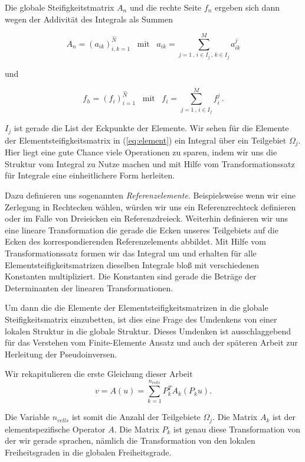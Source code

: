Die globale Steifigkeitstmatrix $A_n$ und die rechte Seite $f_n$ ergeben sich dann wegen der Addivität des Integrals als Summen

\begin{equation*}
A_n = (a_{ik})_{i,k=1}^{\hat{N}} \, \, \, \text{ mit } \, \, \, a_{ik} = \sum_{j=1 \, , \, i \in I_j \, , \, k \in I_j }^M a_{ik}^j  
\end{equation*}

und

\begin{equation*}
f_h = (f_i)_{i=1}^{\hat{N}} \, \, \, \text{ mit } \, \, \, f_i = \sum_{j=1 \, , \, i \in I_j}^M f_i^j \, .
\end{equation*}

$I_j$ ist gerade die List der Eckpunkte der Elemente.
Wir sehen für die Elemente der Elementsteifigkeitsmatrix in (\ref{eq:element}) ein Integral über ein Teilgebiet $\Omega_j$. Hier liegt eine gute Chance viele Operationen zu sparen, indem wir uns die Struktur vom Integral zu Nutze machen und mit Hilfe vom Transformationssatz für Integrale eine einheitlichere Form herleiten.

Dazu definieren uns sogenannten \textit{Referenzelemente}. Beispielsweise wenn wir eine Zerlegung in Rechtecken wählen, würden wir uns ein Referenzrechteck definieren oder im Falle von Dreieicken ein Referenzdreieck. Weiterhin definieren wir uns eine lineare Transformation die gerade die Ecken unseres Teilgebiets auf die Ecken des korrespondierenden Referenzelements abbildet. Mit Hilfe vom Transformationssatz formen wir das Integral um und erhalten für alle Elementsteifigkeitsmatrizen dieselben Integrale bloß mit verschiedenen Konstanten multipliziert. Die Konstanten sind gerade die Beträge der Determinanten der linearen Transformationen.

Um dann die die Elemente der Elementsteifigkeitsmatrizen in die globale Steifigkeitsmatrix einzubetten, ist dies eine Frage des Umdenkens von einer lokalen Struktur in die globale Struktur.
Dieses Umdenken ist ausschlaggebend für das Verstehen vom Finite-Elemente Ansatz und auch der späteren Arbeit zur Herleitung der Pseudoinversen.

Wir rekapitulieren die erste Gleichung dieser Arbeit
\begin{equation} \label{eq:main2}
v=A(u)=\sum_{k=1}^{n_{cells}} P_k^T A_k (P_k u).
\end{equation}

Die Variable $n_{cells}$ ist somit die Anzahl der Teilgebiete $\Omega_j$. Die Matrix $A_k$ ist der elementspezifische Operator $A$. Die Matrix $P_k$ ist genau diese Transformation von der wir gerade sprachen, nämlich die Transformation von den lokalen Freiheitsgraden in die globalen Freiheitsgrade.

